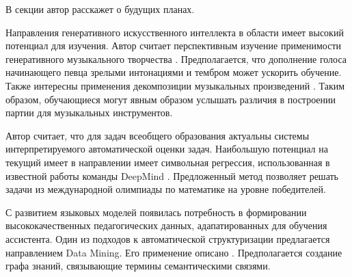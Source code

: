 В секции автор расскажет о будущих планах.

Направления генеративного искусственного интеллекта в области имеет высокий потенциал для изучения. 
Автор считает перспективным изучение применимости генеративного музыкального творчества \cite{vinze2021application}.
Предполагается, что дополнение голоса начинающего певца зрелыми интонациями и тембром может ускорить обучение.
Также интересны применения декомпозиции музыкальных произведений \cite{simpson2015deep}. 
Таким образом, обучающиеся могут явным образом услышать различия в построении партии для музыкальных инструментов.

Автор считает, что для задач всеобщего образования актуальны системы интерпретируемого автоматической оценки задач.
Наибольшую потенциал на текущий имеет в направлении имеет символьная регрессия,
использованная в известной работы команды DeepMind \cite{trinh2024solving}. Предложенный метод позволяет решать
задачи из международной олимпиады по математике на уровне победителей.

С развитием языковых моделей появилась потребность в формировании высококачественных педагогических данных, 
адапатированных для обучения ассистента. Один из подходов к автоматической структуризации предлагается направлением Data Mining.
Его применение описано \cite{romero2013data}. Предполагается создание графа знаний, связывающие термины семантическими связями.



